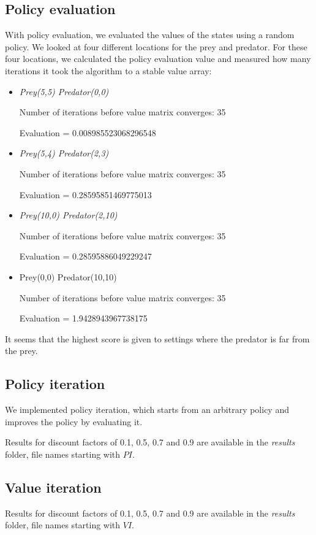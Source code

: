\documentclass{article}
\begin{document}
\subsection{Policy evaluation}
With policy evaluation, we evaluated the values of the states using a random policy. We looked at four different locations for the prey and predator. For these four locations, we calculated the policy evaluation value and measured how many iterations it took the algorithm to a stable value array:

\begin{itemize}
\item \emph{Prey(5,5) Predator(0,0)}

Number of iterations before value matrix converges: 35

Evaluation = 0.008985523068296548

\item \emph{Prey(5,4) Predator(2,3)}

Number of iterations before value matrix converges: 35

Evaluation = 0.28595851469775013

\item \emph{Prey(10,0) Predator(2,10)}

Number of iterations before value matrix converges: 35

Evaluation = 0.28595886049229247

\item Prey(0,0) Predator(10,10)

Number of iterations before value matrix converges: 35

Evaluation = 1.9428943967738175
\end{itemize}

It seems that the highest score is given to settings where the predator is far from the prey.
\subsection{Policy iteration}
We implemented policy iteration, which starts from an arbitrary policy and improves the policy by evaluating it.

Results for discount factors of 0.1, 0.5, 0.7 and 0.9 are available in the \emph{results} folder, file names starting with $PI$.
\subsection{Value iteration}
Results for discount factors of 0.1, 0.5, 0.7 and 0.9 are available in the \emph{results} folder, file names starting with $VI$.
\end{document}
